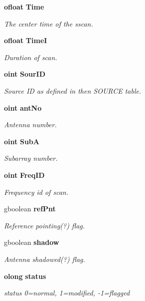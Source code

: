 \begin{CompactItemize}
{\bf ofloat} {\bf Time}
\begin{CompactList}\small\item\em The center time of the sscan. \item\end{CompactList}\item 
{\bf ofloat} {\bf Time\-I}
\begin{CompactList}\small\item\em Duration of scan. \item\end{CompactList}\item 
{\bf oint} {\bf Sour\-ID}
\begin{CompactList}\small\item\em Source ID as defined in then SOURCE table. \item\end{CompactList}\item 
{\bf oint} {\bf ant\-No}
\begin{CompactList}\small\item\em Antenna number. \item\end{CompactList}\item 
{\bf oint} {\bf Sub\-A}
\begin{CompactList}\small\item\em Subarray number. \item\end{CompactList}\item 
{\bf oint} {\bf Freq\-ID}
\begin{CompactList}\small\item\em Frequency id of scan. \item\end{CompactList}\item 
gboolean {\bf ref\-Pnt}
\begin{CompactList}\small\item\em Reference pointing(?) flag. \item\end{CompactList}\item 
gboolean {\bf shadow}
\begin{CompactList}\small\item\em Antenna shadowed(?) flag. \item\end{CompactList}\item 
{\bf olong} {\bf status}
\begin{CompactList}\small\item\em status 0=normal, 1=modified, -1=flagged \item\end{CompactList}\end{CompactItemize}


